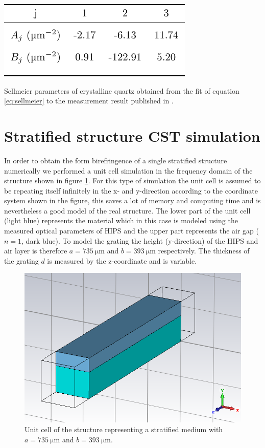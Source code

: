 \begin{table}[H]
    \centering
    \includegraphics[scale=0.9]{images/appendix/sellmeier_parameters_table.pdf}
    \caption{Sellmeier parameters of crystalline quartz obtained from the fit of equation \ref{eq:sellmeier} to the measurement result published in \cite{DGrischkowsky1990}.}
    \label{tab:sellmeier_parameters_table}
\end{table}

\section{Stratified structure CST simulation}
\label{sec:CST simulation}
In order to obtain the form birefringence of a single stratified structure numerically we performed a unit cell simulation in the frequency domain of the structure shown in figure \ref{fig:CST_model}. For this type of simulation the unit cell is assumed to be repeating itself infinitely in the x- and y-direction according to the coordinate system shown in the figure, this saves a lot of memory and computing time and is nevertheless a good model of the real structure. The lower part of the unit cell (light blue) represents the material which in this case is modeled using the measured optical parameters of HIPS and the upper part represents the air gap ($n=1$, dark blue). To model the grating the height (y-direction) of the HIPS and air layer is therefore $a=\SI{735}{\micro \meter}$ and $b=\SI{393}{\micro \meter}$ respectively. The thickness of the grating $d$ is measured by the z-coordinate and is variable. 

\begin{figure}[H]
    \centering
    \includegraphics[scale=0.3]{images/appendix/CST.PNG}
    \caption{Unit cell of the structure representing a stratified medium with $a=\SI{735}{\micro \meter}$ and $b=\SI{393}{\micro \meter}$.}
    \label{fig:CST_model}
\end{figure}

